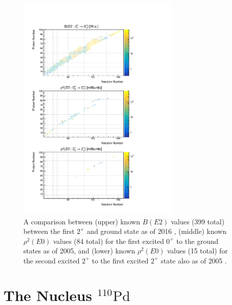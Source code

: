 \begin{figure}[!ht]
  \centering
  \includegraphics[width=0.7\textwidth, height=1.05\textwidth]{intro_compare_E2E0.png}
  \caption[A comparison between literature values of $B(E2)$ and $\rho^2(E0)$ from across the nuclear chart.]{A comparison between (upper) known $B(E2)$ values (399 total) between the first $2^+$ and ground state as of 2016 \cite{Pritychenko2016}, (middle) known $\rho^2(E0)$ values (84 total) for the first excited $0^+$ to the ground states as of 2005, and (lower) known $\rho^2(E0)$ values (15 total) for the second excited $2^+$ to the first excited $2^+$ state also as of 2005 \cite{Kibedi2005}.}
  \label{figure: comparison of E0 and E2 measurements across the nuclear chart}
\end{figure}


\section{The Nucleus $^{110}\mathrm{Pd}$}

